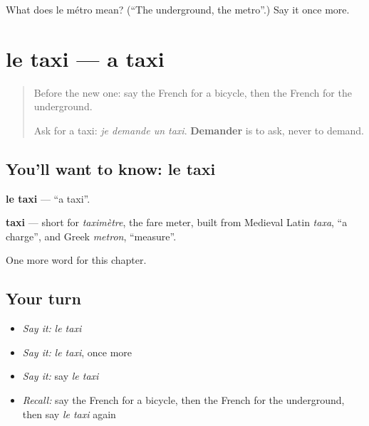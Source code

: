 \begin{tcolorbox}[breakable,colback=teal!4,colframe=teal!35!black,title={Before you move on}]
What does le métro mean? (\textquotedblleft{}The underground, the metro\textquotedblright{}.) Say it once more.
\end{tcolorbox}
\section[le taxi]{le taxi — a taxi}

\label{lesson:FR-C106-taxi}



\begin{quote}
Before the new one: say the French for a bicycle, then the French for the underground.

Ask for a taxi: \emph{je demande un taxi}. \textbf{Demander} is to ask, never to demand.
\end{quote}

\subsection*{You'll want to know: le taxi}
\textbf{le taxi} — \textquotedblleft{}a taxi\textquotedblright{}.

\begin{cousinweb}
\textbf{taxi} — short for \emph{taximètre}, the fare meter, built from Medieval Latin \emph{taxa}, \textquotedblleft{}a charge\textquotedblright{}, and Greek \emph{metron}, \textquotedblleft{}measure\textquotedblright{}.
\end{cousinweb}

\begin{grammarlens}[title={What you've built}]
One more word for this chapter.
\end{grammarlens}

\subsection*{Your turn}
\begin{itemize}
\raggedright
  \item \emph{Say it:} \emph{le taxi}
  \item \emph{Say it:} \emph{le taxi}, once more
  \item \emph{Say it:} say \emph{le taxi}
  \item \emph{Recall:} say the French for a bicycle, then the French for the underground, then say \emph{le taxi} again
\end{itemize}

